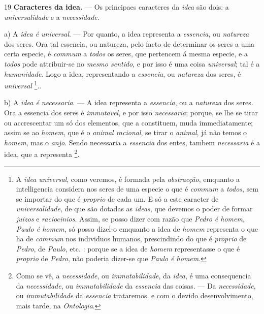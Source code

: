 19 \textbf{Caracteres da idea.} --- Os principaes caracteres da \emph{idea} são dois: a \emph{universalidade} e a \emph{necessidade}.

a) A \emph{idea é universal}. --- Por quanto, a idea representa a \emph{essencia}, ou \emph{natureza} dos seres. Ora tal essencia, ou natureza, pelo facto de determinar os seres a uma certa especie, é \emph{commum} a \emph{todos} os seres, que pertencem á mesma especie, e a \emph{todos} pode attribuir-se no \emph{mesmo sentido}, e por isso é uma coisa \emph{universal}; tal é a \emph{humanidade}. Logo a idea, representando a \emph{essencia}, ou \emph{natureza} dos seres, é \emph{universal} \footnote{A \emph{idea universal}, como veremos, é formada pela \emph{abstracção}, emquanto a intelligencia considera nos seres de uma especie o que é \emph{commum} a \emph{todos}, sem se importar do que é \emph{proprio} de cada um. E só a este caracter de \emph{universalidade}, de que são dotadas as \emph{ideas}, que devemos o poder de formar \emph{juizos} e \emph{raciocinios}. Assim, se posso dizer com razão que \emph{Pedro é homem}, \emph{Paulo é homem}, só posso dizel-o emquanto a idea de \emph{homem} representa o que ha de \emph{commum} nos individuos humanos, prescindindo do que é \emph{proprio} de \emph{Pedro}, de \emph{Paulo}, etc. : porque se a idea de \emph{homem} representasse o que é \emph{proprio} de \emph{Pedro}, não poderia dizer-se que \emph{Paulo é homem}.}..

b) A \emph{idea é necessaria}. --- A idea representa a \emph{essencia}, ou a \emph{natureza} dos seres. Ora a essencia dos seres é \emph{immutavel}, e por isso \emph{necessaria}; porque, se lhe se tirar ou accrescentar um só dos elementos, que a constituem, muda immediatamente; assim se ao \emph{homem}, que é o \emph{animal racional}, se tirar o \emph{animal}, já não temos o \emph{homem}, mas o \emph{anjo}. Sendo necessaria a \emph{essencia} dos entes, tambem \emph{necessaria} é a idea, que a representa \footnote{Como se vê, a \emph{necessidade}, ou \emph{immutabilidade}, da \emph{idea}, é uma consequencia da \emph{necessidade}, ou \emph{immutabilidade} da \emph{essencia} das coisas. --- Da \emph{necessidade}, ou \emph{immutabilidade} da \emph{essencia} trataremos. e com o devido desenvolvimento, mais tarde, na \emph{Ontologia}.}.


